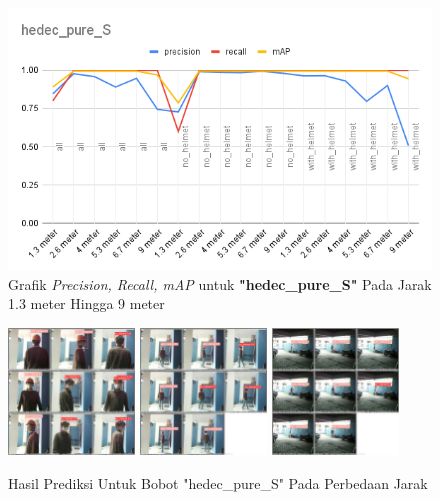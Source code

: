 \begin{enumerate}
  \begin{figure} [h!]
    \centering
    \includegraphics[width=1\textwidth]{gambar/BerdasarkanJarak/hedec_pure_S.png}
    \caption{Grafik \emph{Precision, Recall, mAP} untuk \textbf{"hedec\_pure\_S"} Pada Jarak 1.3 meter Hingga 9 meter}
    \label{fig:grafvaljarak_hedec_pure_S}  
  \end{figure}

  \begin{figure} [h!]
    \centering
    \includegraphics[width=0.3\textwidth]{gambar/BerdasarkanJarak_v2/val_hedec_pure_S/Jarak1_3/val_batch0_pred.jpg}
    \includegraphics[width=0.3\textwidth]{gambar/BerdasarkanJarak_v2/val_hedec_pure_S/Jarak5_3/val_batch0_pred.jpg}
    \includegraphics[width=0.3\textwidth]{gambar/BerdasarkanJarak_v2/val_hedec_pure_S/Jarak9/val_batch0_pred.jpg}
    \caption{Hasil Prediksi Untuk Bobot "hedec\_pure\_S" Pada Perbedaan Jarak}
    \label{fig:valjarak_sample_hedec_pure_S}  
  \end{figure}


\end{enumerate}

